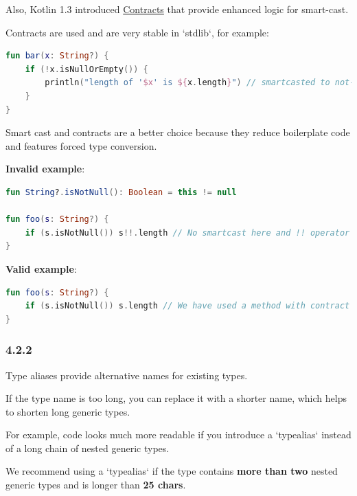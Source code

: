 {{{{Also, Kotlin 1.3 introduced \href{https://kotlinlang.org/docs/reference/whatsnew13.html#contracts}{Contracts} that provide enhanced logic for smart-cast.

Contracts are used and are very stable in `stdlib`, for example:

 



\begin{lstlisting}[language=Kotlin]
fun bar(x: String?) {
    if (!x.isNullOrEmpty()) {
        println("length of '$x' is ${x.length}") // smartcasted to not-null
    }
} 
\end{lstlisting}


Smart cast and contracts are a better choice because they reduce boilerplate code and features forced type conversion.



\textbf{Invalid example}:

\begin{lstlisting}[language=Kotlin]
fun String?.isNotNull(): Boolean = this != null

fun foo(s: String?) {
    if (s.isNotNull()) s!!.length // No smartcast here and !! operator is used
}
\end{lstlisting}


\textbf{Valid example}:

\begin{lstlisting}[language=Kotlin]
fun foo(s: String?) {
    if (s.isNotNull()) s.length // We have used a method with contract from stdlib that helped compiler to execute smart cast
}
\end{lstlisting}


\subsubsection*{\textbf{4.2.2}}
\leavevmode\newline

\label{sec:4.2.2}



Type aliases provide alternative names for existing types.

If the type name is too long, you can replace it with a shorter name, which helps to shorten long generic types.

For example, code looks much more readable if you introduce a `typealias` instead of a long chain of nested generic types.

We recommend using a `typealias` if the type contains \textbf{more than two} nested generic types and is longer than \textbf{25 chars}.



}}}}
